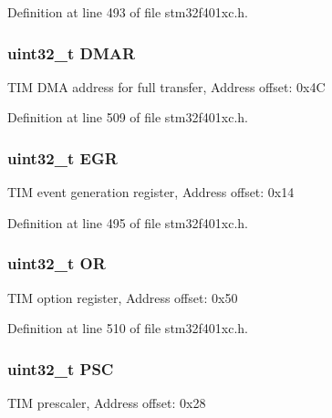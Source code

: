Definition at line 493 of file stm32f401xc.\+h.

\subsubsection[{\texorpdfstring{D\+M\+AR}{DMAR}}]{ uint32\+\_\+t D\+M\+AR}\hypertarget{struct_t_i_m___type_def_ab9087f2f31dd5edf59de6a59ae4e67ae}{}\label{struct_t_i_m___type_def_ab9087f2f31dd5edf59de6a59ae4e67ae}
T\+IM D\+MA address for full transfer, Address offset\+: 0x4C 

Definition at line 509 of file stm32f401xc.\+h.

\subsubsection[{\texorpdfstring{E\+GR}{EGR}}]{ uint32\+\_\+t E\+GR}\hypertarget{struct_t_i_m___type_def_a196ebdaac12b21e90320c6175da78ef6}{}\label{struct_t_i_m___type_def_a196ebdaac12b21e90320c6175da78ef6}
T\+IM event generation register, Address offset\+: 0x14 

Definition at line 495 of file stm32f401xc.\+h.

\subsubsection[{\texorpdfstring{OR}{OR}}]{ uint32\+\_\+t OR}\hypertarget{struct_t_i_m___type_def_a75ade4a9b3d40781fd80ce3e6589e98b}{}\label{struct_t_i_m___type_def_a75ade4a9b3d40781fd80ce3e6589e98b}
T\+IM option register, Address offset\+: 0x50 

Definition at line 510 of file stm32f401xc.\+h.

\subsubsection[{\texorpdfstring{P\+SC}{PSC}}]{ uint32\+\_\+t P\+SC}\hypertarget{struct_t_i_m___type_def_a9d4c753f09cbffdbe5c55008f0e8b180}{}\label{struct_t_i_m___type_def_a9d4c753f09cbffdbe5c55008f0e8b180}
T\+IM prescaler, Address offset\+: 0x28 

